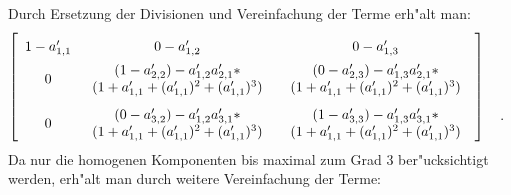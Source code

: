 Durch Ersetzung der Divisionen und Vereinfachung der Terme erh"alt man:
\[
    \left[
        \begin{array}{ccc}
            1 - a_{1,1}'
        &   0 - a_{1,2}'
        &   0 - a_{1,3}' \MatStrut
        \\     0
        &   \begin{array}{c}
                (1 - a_{2,2}') - a_{1,2}'a_{2,1}' *
            \\  (1 + a_{1,1}' + (a_{1,1}')^2 + (a_{1,1}')^3)
            \end{array}
        &   \begin{array}{c}
                (0 - a_{2,3}')  - a_{1,3}'a_{2,1}' *
            \\  (1 + a_{1,1}' + (a_{1,1}')^2 + (a_{1,1}')^3)
            \end{array} \LMatStrut
        \\     0
        &   \begin{array}{c}
                (0 - a_{3,2}') - a_{1,2}'a_{3,1}' *
            \\  (1 + a_{1,1}' + (a_{1,1}')^2 + (a_{1,1}')^3)
            \end{array}
        &   \begin{array}{c}
                (1 - a_{3,3}') - a_{1,3}'a_{3,1}' *
            \\  (1 + a_{1,1}' + (a_{1,1}')^2 + (a_{1,1}')^3)
            \end{array}
        \end{array}
    \right]
    \begin{array}{c}
        \MatStrut \\ \MatStrut \\ \MyPunkt \MatStrut
    \end{array}
\]
Da nur die homogenen Komponenten bis maximal zum Grad $3$ ber"ucksichtigt
werden, erh"alt man durch weitere Vereinfachung der Terme:
